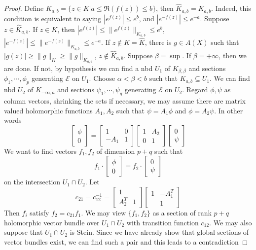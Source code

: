 \documentclass[../main.tex]{subfiles}
\begin{document}
\begin{proof}
Define $K_{a,b}=\{z\in K|a\leq\Re(f(z))\leq b\}$, then $\widehat K_{a,b}=K_{a,b}$. Indeed, this condition is equivalent to saying $|e^{f(z)}|\leq e^b$, and $|e^{-f(z)}|\leq e^{-a}$. Suppose $z\in\widehat K_{a,b}$. If $z\in K$, then $|e^{f(z)}|\leq\|e^{f(z)}\|_{K_{a,b}}\leq e^b$, $|e^{-f(z)}|\leq\|e^{-f(z)}\|_{K_{a,b}}\leq e^{-a}$. If $z\notin K=\widehat K$, there is $g\in A(X)$ such that $|g(z)|\geq\|g\|_K\geq\|g\|_{K_{a,b}}$, $z\notin \widehat K_{a,b}$. Suppose $\beta=\sup$. If $\beta=+\infty$, then we are done. If not, by hypothesis we can find a nbd $U_1$ of $K_{\beta,\beta}$ and sections $\phi_1,\cdots,\phi_p$ generating $\mathcal E$ on $U_1$. Choose $\alpha<\beta<b$ such that $K_{a,b}\subseteq U_1$. We can find nbd $U_2$ of $K_{-\infty,a}$ and sections $\psi_1,\cdots,\psi_q$ generating $\mathcal E$ on $U_2$. Regard $\phi,\psi$ as column vectors, shrinking the sets if necessary, we may assume there are matrix valued holomorphic functions $A_1,A_2$ such that $\psi=A_1\phi$ and $\phi=A_2\psi$. In other words
\[\begin{bmatrix}
\phi\\
0
\end{bmatrix}=\begin{bmatrix}
1&0\\
-A_1&1
\end{bmatrix}\begin{bmatrix}
1&A_2\\
0&1
\end{bmatrix}\begin{bmatrix}
0\\
\psi
\end{bmatrix}\]
We wnat to find vectors $f_1,f_2$ of dimension $p+q$ such that
\[f_1\cdot\begin{bmatrix}
\phi\\
0
\end{bmatrix}=f_2\cdot\begin{bmatrix}
0\\
\psi
\end{bmatrix}\]
on the intersection $U_1\cap U_2$. Let
\[c_{21}=c_{12}^{-1}=\begin{bmatrix}
1&\\
A_2^T&1
\end{bmatrix}\begin{bmatrix}
1&-A_1^T\\
&1
\end{bmatrix}\]
Then $f_i$ satisfy $f_2=c_{21}f_1$. We may view $\{f_1,f_2\}$ as a section of rank $p+q$ holomorphic vector bundle over $U_1\cap U_2$ with transition function $c_{12}$. We may also suppose that $U_1\cap U_2$ is Stein. Since we have already show that global sections of vector bundles exist, we can find such a pair and this leads to a contradiction
\end{proof}
\end{document}
